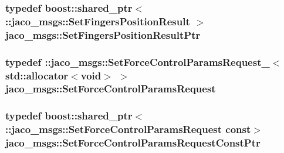 \subsubsection[{\texorpdfstring{Set\+Fingers\+Position\+Result\+Ptr}{SetFingersPositionResultPtr}}]{\setlength{\rightskip}{0pt plus 5cm}typedef boost\+::shared\+\_\+ptr$<$ \+::{\bf jaco\+\_\+msgs\+::\+Set\+Fingers\+Position\+Result} $>$ {\bf jaco\+\_\+msgs\+::\+Set\+Fingers\+Position\+Result\+Ptr}}\hypertarget{namespacejaco__msgs_a343e6682b2f68e3ff22370633a5b08fb}{}\label{namespacejaco__msgs_a343e6682b2f68e3ff22370633a5b08fb}
\subsubsection[{\texorpdfstring{Set\+Force\+Control\+Params\+Request}{SetForceControlParamsRequest}}]{\setlength{\rightskip}{0pt plus 5cm}typedef \+::{\bf jaco\+\_\+msgs\+::\+Set\+Force\+Control\+Params\+Request\+\_\+}$<$std\+::allocator$<$void$>$ $>$ {\bf jaco\+\_\+msgs\+::\+Set\+Force\+Control\+Params\+Request}}\hypertarget{namespacejaco__msgs_a3486b7826c8a999135bb2eded905e7a8}{}\label{namespacejaco__msgs_a3486b7826c8a999135bb2eded905e7a8}
\subsubsection[{\texorpdfstring{Set\+Force\+Control\+Params\+Request\+Const\+Ptr}{SetForceControlParamsRequestConstPtr}}]{\setlength{\rightskip}{0pt plus 5cm}typedef boost\+::shared\+\_\+ptr$<$ \+::{\bf jaco\+\_\+msgs\+::\+Set\+Force\+Control\+Params\+Request} const$>$ {\bf jaco\+\_\+msgs\+::\+Set\+Force\+Control\+Params\+Request\+Const\+Ptr}}\hypertarget{namespacejaco__msgs_a0b57aa518c819516dbdb7a991e89c945}{}\label{namespacejaco__msgs_a0b57aa518c819516dbdb7a991e89c945}
